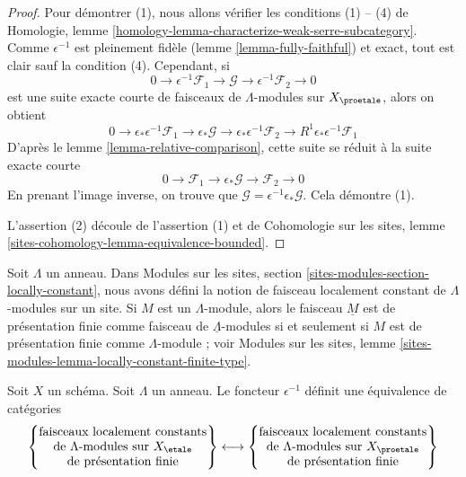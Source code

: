 \begin{proof}
Pour démontrer (1), nous allons vérifier les conditions (1) -- (4) de
Homologie, lemme \ref{homology-lemma-characterize-weak-serre-subcategory}.
Comme $\epsilon^{-1}$ est pleinement fidèle (lemme \ref{lemma-fully-faithful})
et exact, tout est clair sauf la condition (4).
Cependant, si
$$
0 \to \epsilon^{-1}\mathcal{F}_1 \to \mathcal{G} \to
\epsilon^{-1}\mathcal{F}_2 \to 0
$$
est une suite exacte courte de faisceaux de $\Lambda$-modules sur $X_\proetale$,
alors on obtient
$$
0 \to \epsilon_*\epsilon^{-1}\mathcal{F}_1 \to \epsilon_*\mathcal{G} \to
\epsilon_*\epsilon^{-1}\mathcal{F}_2 \to
R^1\epsilon_*\epsilon^{-1}\mathcal{F}_1
$$
D'après le lemme \ref{lemma-relative-comparison},
cette suite se réduit à la suite exacte courte
$$
0 \to \mathcal{F}_1 \to \epsilon_*\mathcal{G} \to \mathcal{F}_2 \to 0
$$
En prenant l'image inverse, on trouve que $\mathcal{G} = \epsilon^{-1}\epsilon_*\mathcal{G}$.
Cela démontre (1).

\medskip\noindent
L'assertion (2) découle de l'assertion (1) et de
Cohomologie sur les sites, lemme \ref{sites-cohomology-lemma-equivalence-bounded}.
\end{proof}

\noindent
Soit $\Lambda$ un anneau. Dans
Modules sur les sites, section \ref{sites-modules-section-locally-constant},
nous avons défini la notion de faisceau localement constant de $\Lambda$-modules
sur un site. Si $M$ est un $\Lambda$-module, alors le faisceau $\underline{M}$ est
de présentation finie comme faisceau de $\underline{\Lambda}$-modules si et seulement
si $M$ est de présentation finie comme $\Lambda$-module ; voir
Modules sur les sites, lemme \ref{sites-modules-lemma-locally-constant-finite-type}.

\begin{lemma}
\label{lemma-compare-locally-constant}
Soit $X$ un schéma. Soit $\Lambda$ un anneau.
Le foncteur $\epsilon^{-1}$ définit une équivalence de catégories
$$
\left\{
\begin{matrix}
\text{faisceaux localement constants}\\
\text{de }\Lambda\text{-modules sur }X_\etale\\
\text{de présentation finie}
\end{matrix}
\right\}
\longleftrightarrow
\left\{
\begin{matrix}
\text{faisceaux localement constants}\\
\text{de }\Lambda\text{-modules sur }X_\proetale\\
\text{de présentation finie}
\end{matrix}
\right\}
$$
\end{lemma}

